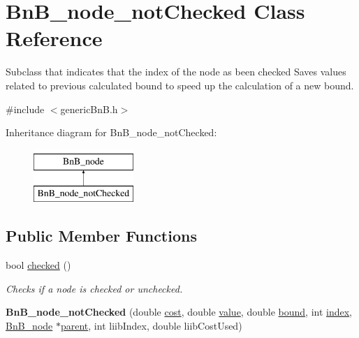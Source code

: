 \hypertarget{class_bn_b__node__not_checked}{}\section{Bn\+B\+\_\+node\+\_\+not\+Checked Class Reference}
\label{class_bn_b__node__not_checked}


Subclass that indicates that the index of the node as been checked Saves values related to previous calculated bound to speed up the calculation of a new bound.  




{\ttfamily \#include $<$generic\+Bn\+B.\+h$>$}

Inheritance diagram for Bn\+B\+\_\+node\+\_\+not\+Checked\+:\begin{figure}[H]
\begin{center}
\leavevmode
\includegraphics[height=2.000000cm]{class_bn_b__node__not_checked}
\end{center}
\end{figure}
\subsection*{Public Member Functions}
\begin{DoxyCompactItemize}
\item 
bool \hyperlink{class_bn_b__node__not_checked_a470c31c7d9f0cce678a2d9074a481407}{checked} ()
\begin{DoxyCompactList}\small\item\em Checks if a node is checked or unchecked. \end{DoxyCompactList}\item 
\hypertarget{class_bn_b__node__not_checked_a9bd7b93617b59a61e24e663478552b98}{}{\bfseries Bn\+B\+\_\+node\+\_\+not\+Checked} (double \hyperlink{class_bn_b__node_a6a44afc83f3d0c1601804b61cf03fbf1}{cost}, double \hyperlink{class_bn_b__node_a726b74bbceb33532ee8678e0722d62aa}{value}, double \hyperlink{class_bn_b__node_a275b8c6f02b922e74a7f82d8fb3b5cf9}{bound}, int \hyperlink{class_bn_b__node_a531520424d5cc944a542a984cc14f32f}{index}, \hyperlink{class_bn_b__node}{Bn\+B\+\_\+node} $\ast$\hyperlink{class_bn_b__node_ac70c63a5ed68adefb9bc9540ac8e68dd}{parent}, int liib\+Index, double liib\+Cost\+Used)\label{class_bn_b__node__not_checked_a9bd7b93617b59a61e24e663478552b98}

\end{DoxyCompactItemize}
